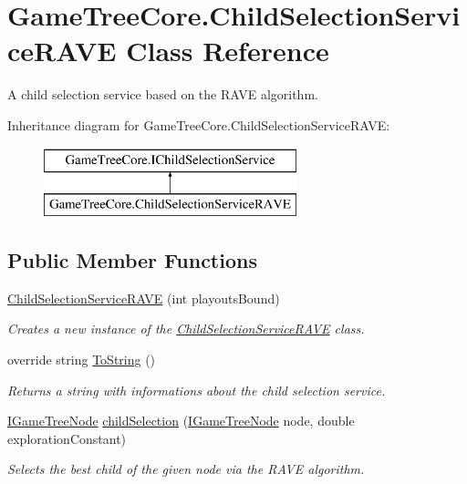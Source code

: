 \hypertarget{class_game_tree_core_1_1_child_selection_service_r_a_v_e}{}\section{Game\+Tree\+Core.\+Child\+Selection\+Service\+R\+A\+VE Class Reference}
\label{class_game_tree_core_1_1_child_selection_service_r_a_v_e}


A child selection service based on the R\+A\+VE algorithm.  


Inheritance diagram for Game\+Tree\+Core.\+Child\+Selection\+Service\+R\+A\+VE\+:\begin{figure}[H]
\begin{center}
\leavevmode
\includegraphics[height=2.000000cm]{class_game_tree_core_1_1_child_selection_service_r_a_v_e}
\end{center}
\end{figure}
\subsection*{Public Member Functions}
\begin{DoxyCompactItemize}
\item 
\mbox{\hyperlink{class_game_tree_core_1_1_child_selection_service_r_a_v_e_a45079106ea7e731b606699e6c5123c14}{Child\+Selection\+Service\+R\+A\+VE}} (int playouts\+Bound)
\begin{DoxyCompactList}\small\item\em Creates a new instance of the \mbox{\hyperlink{class_game_tree_core_1_1_child_selection_service_r_a_v_e}{Child\+Selection\+Service\+R\+A\+VE}} class. \end{DoxyCompactList}\item 
override string \mbox{\hyperlink{class_game_tree_core_1_1_child_selection_service_r_a_v_e_a995e1c2dfd72caa32cee278de8a836fc}{To\+String}} ()
\begin{DoxyCompactList}\small\item\em Returns a string with informations about the child selection service. \end{DoxyCompactList}\item 
\mbox{\hyperlink{interface_game_tree_core_1_1_i_game_tree_node}{I\+Game\+Tree\+Node}} \mbox{\hyperlink{class_game_tree_core_1_1_child_selection_service_r_a_v_e_a5a6fe93864c94224724eee96f51fd9af}{child\+Selection}} (\mbox{\hyperlink{interface_game_tree_core_1_1_i_game_tree_node}{I\+Game\+Tree\+Node}} node, double exploration\+Constant)
\begin{DoxyCompactList}\small\item\em Selects the best child of the given node via the R\+A\+VE algorithm. \end{DoxyCompactList}\end{DoxyCompactItemize}


